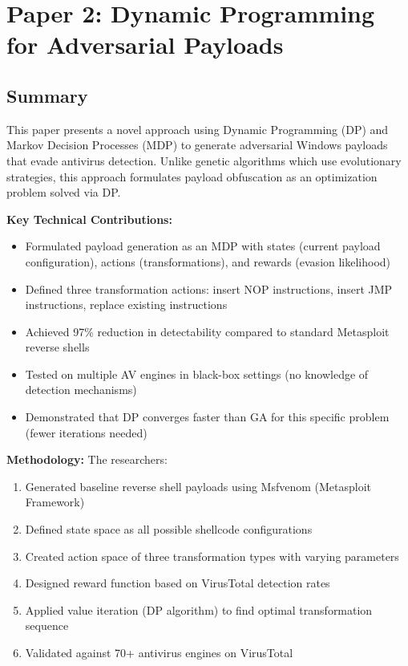 \documentclass[11pt,conference]{IEEEtran}
\begin{document}
\section{Paper 2: Dynamic Programming for Adversarial Payloads}

\subsection{Summary}

This paper presents a novel approach using Dynamic Programming (DP) and Markov Decision Processes (MDP) to generate adversarial Windows payloads that evade antivirus detection. Unlike genetic algorithms which use evolutionary strategies, this approach formulates payload obfuscation as an optimization problem solved via DP.

\textbf{Key Technical Contributions:}
\begin{itemize}
    \item Formulated payload generation as an MDP with states (current payload configuration), actions (transformations), and rewards (evasion likelihood)
    \item Defined three transformation actions: insert NOP instructions, insert JMP instructions, replace existing instructions
    \item Achieved 97\% reduction in detectability compared to standard Metasploit reverse shells
    \item Tested on multiple AV engines in black-box settings (no knowledge of detection mechanisms)
    \item Demonstrated that DP converges faster than GA for this specific problem (fewer iterations needed)
\end{itemize}

\textbf{Methodology:}
The researchers:
\begin{enumerate}
    \item Generated baseline reverse shell payloads using Msfvenom (Metasploit Framework)
    \item Defined state space as all possible shellcode configurations
    \item Created action space of three transformation types with varying parameters
    \item Designed reward function based on VirusTotal detection rates
    \item Applied value iteration (DP algorithm) to find optimal transformation sequence
    \item Validated against 70+ antivirus engines on VirusTotal
\end{enumerate}
\end{document}
